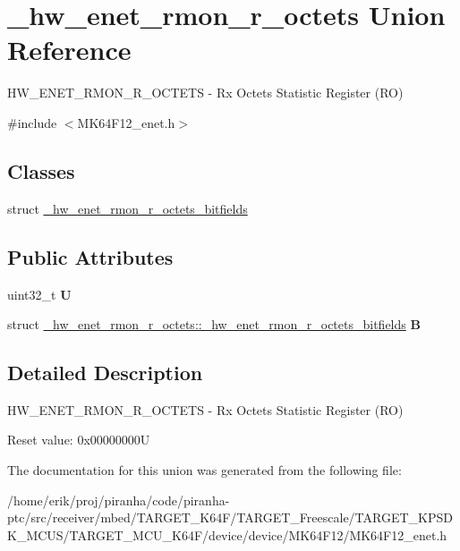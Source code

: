\hypertarget{union__hw__enet__rmon__r__octets}{}\section{\+\_\+hw\+\_\+enet\+\_\+rmon\+\_\+r\+\_\+octets Union Reference}
\label{union__hw__enet__rmon__r__octets}


H\+W\+\_\+\+E\+N\+E\+T\+\_\+\+R\+M\+O\+N\+\_\+\+R\+\_\+\+O\+C\+T\+E\+TS -\/ Rx Octets Statistic Register (RO)  




{\ttfamily \#include $<$M\+K64\+F12\+\_\+enet.\+h$>$}

\subsection*{Classes}
\begin{DoxyCompactItemize}
\item 
struct \hyperlink{struct__hw__enet__rmon__r__octets_1_1__hw__enet__rmon__r__octets__bitfields}{\+\_\+hw\+\_\+enet\+\_\+rmon\+\_\+r\+\_\+octets\+\_\+bitfields}
\end{DoxyCompactItemize}
\subsection*{Public Attributes}
\begin{DoxyCompactItemize}
\item 
uint32\+\_\+t {\bfseries U}\hypertarget{union__hw__enet__rmon__r__octets_a12af4f1769c91eaa5ab2c553b261dbe2}{}\label{union__hw__enet__rmon__r__octets_a12af4f1769c91eaa5ab2c553b261dbe2}

\item 
struct \hyperlink{struct__hw__enet__rmon__r__octets_1_1__hw__enet__rmon__r__octets__bitfields}{\+\_\+hw\+\_\+enet\+\_\+rmon\+\_\+r\+\_\+octets\+::\+\_\+hw\+\_\+enet\+\_\+rmon\+\_\+r\+\_\+octets\+\_\+bitfields} {\bfseries B}\hypertarget{union__hw__enet__rmon__r__octets_a9935e5ce57eae2a9d4f2a4cb21418fb4}{}\label{union__hw__enet__rmon__r__octets_a9935e5ce57eae2a9d4f2a4cb21418fb4}

\end{DoxyCompactItemize}


\subsection{Detailed Description}
H\+W\+\_\+\+E\+N\+E\+T\+\_\+\+R\+M\+O\+N\+\_\+\+R\+\_\+\+O\+C\+T\+E\+TS -\/ Rx Octets Statistic Register (RO) 

Reset value\+: 0x00000000U 

The documentation for this union was generated from the following file\+:\begin{DoxyCompactItemize}
\item 
/home/erik/proj/piranha/code/piranha-\/ptc/src/receiver/mbed/\+T\+A\+R\+G\+E\+T\+\_\+\+K64\+F/\+T\+A\+R\+G\+E\+T\+\_\+\+Freescale/\+T\+A\+R\+G\+E\+T\+\_\+\+K\+P\+S\+D\+K\+\_\+\+M\+C\+U\+S/\+T\+A\+R\+G\+E\+T\+\_\+\+M\+C\+U\+\_\+\+K64\+F/device/device/\+M\+K64\+F12/M\+K64\+F12\+\_\+enet.\+h\end{DoxyCompactItemize}
